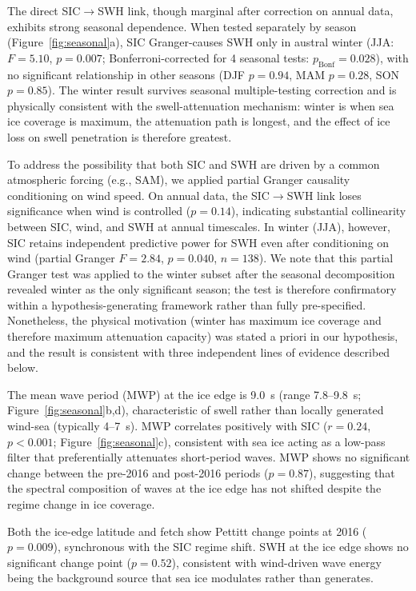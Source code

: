 \documentclass[11pt]{article}
\begin{document}
The direct SIC$\to$SWH link, though marginal after correction on annual data, exhibits strong seasonal dependence. When tested separately by season (Figure~\ref{fig:seasonal}a), SIC Granger-causes SWH only in austral winter (JJA: $F = 5.10$, $p = 0.007$; Bonferroni-corrected for 4 seasonal tests: $p_{\mathrm{Bonf}} = 0.028$), with no significant relationship in other seasons (DJF $p = 0.94$, MAM $p = 0.28$, SON $p = 0.85$). The winter result survives seasonal multiple-testing correction and is physically consistent with the swell-attenuation mechanism: winter is when sea ice coverage is maximum, the attenuation path is longest, and the effect of ice loss on swell penetration is therefore greatest.

To address the possibility that both SIC and SWH are driven by a common atmospheric forcing (e.g., SAM), we applied partial Granger causality conditioning on wind speed. On annual data, the SIC$\to$SWH link loses significance when wind is controlled ($p = 0.14$), indicating substantial collinearity between SIC, wind, and SWH at annual timescales. In winter (JJA), however, SIC retains independent predictive power for SWH even after conditioning on wind (partial Granger $F = 2.84$, $p = 0.040$, $n = 138$). We note that this partial Granger test was applied to the winter subset after the seasonal decomposition revealed winter as the only significant season; the test is therefore confirmatory within a hypothesis-generating framework rather than fully pre-specified. Nonetheless, the physical motivation (winter has maximum ice coverage and therefore maximum attenuation capacity) was stated a priori in our hypothesis, and the result is consistent with three independent lines of evidence described below.

The mean wave period (MWP) at the ice edge is 9.0~s (range 7.8--9.8~s; Figure~\ref{fig:seasonal}b,d), characteristic of swell rather than locally generated wind-sea (typically 4--7~s). MWP correlates positively with SIC ($r = 0.24$, $p < 0.001$; Figure~\ref{fig:seasonal}c), consistent with sea ice acting as a low-pass filter that preferentially attenuates short-period waves. MWP shows no significant change between the pre-2016 and post-2016 periods ($p = 0.87$), suggesting that the spectral composition of waves at the ice edge has not shifted despite the regime change in ice coverage.

Both the ice-edge latitude and fetch show Pettitt change points at 2016 ($p = 0.009$), synchronous with the SIC regime shift. SWH at the ice edge shows no significant change point ($p = 0.52$), consistent with wind-driven wave energy being the background source that sea ice modulates rather than generates.
\end{document}
